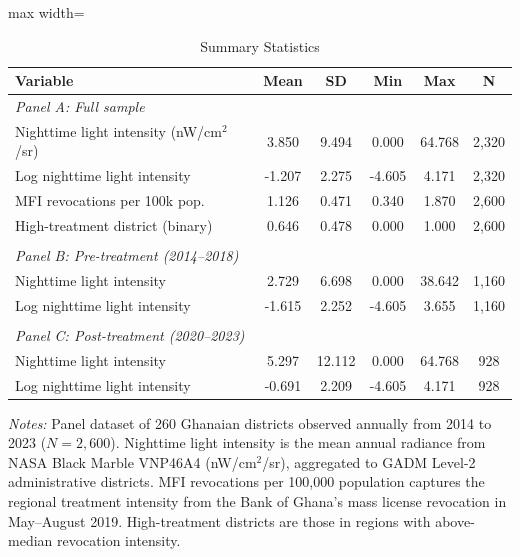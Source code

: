 \begin{table}[htbp]
\centering
\caption{Summary Statistics}
\label{tab:summary}
\begin{adjustbox}{max width=\textwidth}
\begin{tabular}{lccccc}
\toprule
Variable & Mean & SD & Min & Max & N \\
\midrule
\textit{Panel A: Full sample} \\
\addlinespace
Nighttime light intensity (nW/cm$^2$/sr) & 3.850 & 9.494 & 0.000 & 64.768 & 2,320 \\
Log nighttime light intensity & -1.207 & 2.275 & -4.605 & 4.171 & 2,320 \\
MFI revocations per 100k pop. & 1.126 & 0.471 & 0.340 & 1.870 & 2,600 \\
High-treatment district (binary) & 0.646 & 0.478 & 0.000 & 1.000 & 2,600 \\
 \\
\textit{Panel B: Pre-treatment (2014--2018)} \\
\addlinespace
Nighttime light intensity & 2.729 & 6.698 & 0.000 & 38.642 & 1,160 \\
Log nighttime light intensity & -1.615 & 2.252 & -4.605 & 3.655 & 1,160 \\
 \\
\textit{Panel C: Post-treatment (2020--2023)} \\
\addlinespace
Nighttime light intensity & 5.297 & 12.112 & 0.000 & 64.768 & 928 \\
Log nighttime light intensity & -0.691 & 2.209 & -4.605 & 4.171 & 928 \\
\bottomrule
\end{tabular}
\end{adjustbox}
\par\vspace{0.3em}
{\footnotesize \textit{Notes:} Panel dataset of 260 Ghanaian districts observed annually from 2014 to 2023 ($N = 2,600$). Nighttime light intensity is the mean annual radiance from NASA Black Marble VNP46A4 (nW/cm$^2$/sr), aggregated to GADM Level-2 administrative districts. MFI revocations per 100,000 population captures the regional treatment intensity from the Bank of Ghana's mass license revocation in May--August 2019. High-treatment districts are those in regions with above-median revocation intensity.
}
\end{table}

